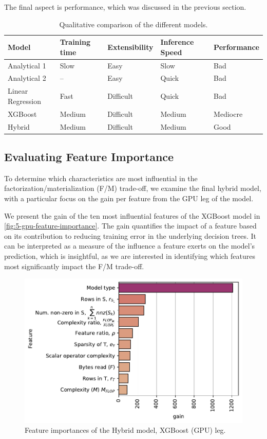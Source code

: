 The final aspect is performance, which was discussed in the previous section.

\begin{table}[ht]
    \centering
    \begin{tabular}{lllll}
        \toprule
        Model             & Training time & Extensibility & Inference Speed & Performance \\
        \midrule
        Analytical 1      & Slow          & Easy          & Slow            & Bad         \\
        Analytical 2      & --            & Easy          & Quick           & Bad         \\
        Linear Regression & Fast          & Difficult     & Quick           & Bad         \\
        XGBoost           & Medium        & Difficult     & Medium          & Mediocre    \\
        Hybrid            & Medium        & Difficult     & Medium          & Good        \\
        \bottomrule
    \end{tabular}
    \caption{Qualitative comparison of the different models.}
    \label{tab:5-meta-results}
\end{table}

\subsection{Evaluating Feature Importance}
\label{subsec:6-feature-importance}
To determine which characteristics are most influential in the factorization/materialization (F/M) trade-off, we examine the final hybrid model, with a particular focus on the gain per feature from the GPU leg of the model.

We present the gain of the ten most influential features of the XGBoost model in \autoref{fig:5-gpu-feature-importance}. The gain quantifies the impact of a feature based on its contribution to reducing training error in the underlying decision trees. It can be interpreted as a measure of the influence a feature exerts on the model's prediction, which is insightful, as we are interested in identifying which features most significantly impact the F/M trade-off.
\begin{figure}[ht]
    \centering
    \includegraphics[width=0.75\linewidth]{chapters/05_cost_estimation/figures/xgboost-feat-importance.pdf}
    \caption[Feature importances of the hybrid model]{Feature importances of the Hybrid model, XGBoost (GPU) leg.}
    \label{fig:5-gpu-feature-importance}
\end{figure}

